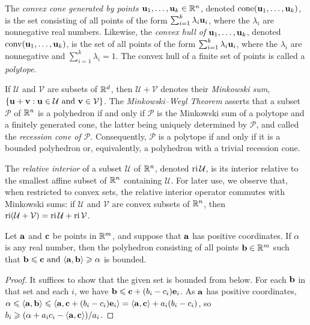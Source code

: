 \documentclass[11pt]{amsart}
\begin{document}
The \emph{convex cone generated by points $\mathbf{u}_1,\ldots,\mathbf{u}_k \in \mathbb{R}^n$}, denoted $\operatorname{cone}(\mathbf{u}_1,\ldots,\mathbf{u}_k)$, is the set consisting of all points of the form $\sum_{i=1}^k \lambda_i \mathbf{u}_i$, where the $\lambda_i$ are nonnegative real numbers.
Likewise, the \emph{convex hull of $\mathbf{u}_1,\ldots,\mathbf{u}_k$}, denoted $\operatorname{conv}(\mathbf{u}_1,\ldots,\mathbf{u}_k)$, is the set of all points of the form $\sum_{i=1}^k \lambda_i \mathbf{u}_i$, where the $\lambda_i$ are nonnegative and $\sum_{i=1}^k \lambda_i = 1$.
The convex hull of a finite set of points is called a \emph{polytope}.

If $\mathcal{U}$ and $\mathcal{V}$ are subsets of $\mathbb{R}^d$, then $\mathcal{U}+\mathcal{V}$ denotes their \emph{Minkowski sum}, $\{\mathbf{u}+\mathbf{v}: \mathbf{u}\in \mathcal{U}\text{ and }\mathbf{v}\in \mathcal{V}\}$.
The \emph{Minkowski--Weyl Theorem} asserts that a subset $\mathcal{P}$ of $\mathbb{R}^n$ is a polyhedron if and only if $\mathcal{P}$ is the Minkowski sum of a polytope and a finitely generated cone, the latter being uniquely determined by $\mathcal{P}$, and called the \emph{recession cone of $\mathcal{P}$}.
Consequently, $\mathcal{P}$ is a polytope if and only if it is a bounded polyhedron or, equivalently, a polyhedron with a trivial recession cone. 

The \emph{relative interior} of a subset $\mathcal{U}$ of $\mathbb{R}^n$, denoted $\operatorname{ri} \mathcal{U}$, is its interior relative to the smallest affine subset of $\mathbb{R}^n$ containing $\mathcal{U}$.
For later use, we observe that, when restricted to convex sets, the relative interior operator commutes with Minkowski sums: if $\mathcal{U}$ and $\mathcal{V}$ are convex subsets of $\mathbb{R}^n$, then $\operatorname{ri}(\mathcal{U}+\mathcal{V})=\operatorname{ri} \mathcal{U}+\operatorname{ri} \mathcal{V}$.

\begin{proposition}  
   \label{bounded polytope: L}
   Let $\mathbf{a}$ and $\mathbf{c}$ be points in $\mathbb{R}^m$, and suppose that $\mathbf{a}$ has positive coordinates.
   If $\alpha$ is any real number, then the polyhedron consisting of all points $\mathbf{b} \in \mathbb{R}^m$ such that  $\mathbf{b} \leqslant \mathbf{c} \text{ and } \langle \mathbf{a}, \mathbf{b} \rangle \geqslant \alpha$ is bounded.
\end{proposition}

\begin{proof}
   It suffices to show that the given set is bounded from below.
   For each $\mathbf{b}$ in that set and each $i$, we have $\mathbf{b}\leqslant \mathbf{c} + (b_i - c_i)\mathbf{e}_i$.
   As $\mathbf{a}$ has positive coordinates, $\alpha\leqslant \langle \mathbf{a}, \mathbf{b} \rangle\leqslant \langle \mathbf{a}, \mathbf{c} + (b_i -c_i)\mathbf{e}_i \rangle = 
  \langle \mathbf{a}, \mathbf{c} \rangle + a_i(b_i - c_i)$, so $b_i\geqslant (\alpha + a_ic_i - \langle \mathbf{a}, \mathbf{c} \rangle)/a_i$.
\end{proof}
\end{document}
